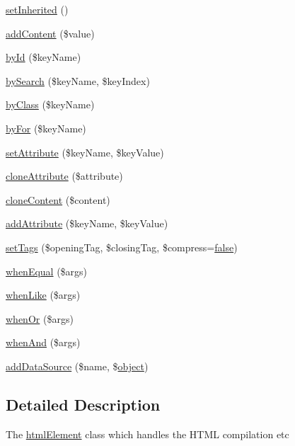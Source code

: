 \begin{DoxyCompactItemize}
\hyperlink{classhtmlElement_ade31cfc5c7d655a21183e18bd0ea492f}{set\+Inherited} ()
\item 
\hyperlink{classhtmlElement_a063bcf0695c98e25ff2b7fa9ef3c88bf}{add\+Content} (\$value)
\item 
\hyperlink{classhtmlElement_a231a77af8cc0ecb36a0714a8888c278f}{by\+Id} (\$key\+Name)
\item 
\hyperlink{classhtmlElement_a8cc57a9db714d6f615bb169424ba505c}{by\+Search} (\$key\+Name, \$key\+Index)
\item 
\hyperlink{classhtmlElement_aae8d6a0e00314fdd72301557161b4054}{by\+Class} (\$key\+Name)
\item 
\hyperlink{classhtmlElement_a329d8c6c7a261b78d39cd4b401320616}{by\+For} (\$key\+Name)
\item 
\hyperlink{classhtmlElement_ac7e4f67382cecd0b2cf4516ef38f0480}{set\+Attribute} (\$key\+Name, \$key\+Value)
\item 
\hyperlink{classhtmlElement_a5e50a939a38f541544c0166871da8853}{clone\+Attribute} (\$attribute)
\item 
\hyperlink{classhtmlElement_a505f41f80a0c7c027dcffe11ee669ff0}{clone\+Content} (\$content)
\item 
\hyperlink{classhtmlElement_a828427f0afb3dc929098581dc7df31b6}{add\+Attribute} (\$key\+Name, \$key\+Value)
\item 
\hyperlink{classhtmlElement_adb7efcd82bb90b24024930604bb9da5d}{set\+Tags} (\$opening\+Tag, \$closing\+Tag, \$compress=\hyperlink{tina4_8php_aec2deb5590a84bee262c3bea206ae88f}{false})
\item 
\hyperlink{classhtmlElement_a60b2acdcaba9e0916863769af9de9b08}{when\+Equal} (\$args)
\item 
\hyperlink{classhtmlElement_afd1361f0a10bdb099102e22f7ecf63d3}{when\+Like} (\$args)
\item 
\hyperlink{classhtmlElement_a93cf423600b179eb6f71e6bcd7a250e2}{when\+Or} (\$args)
\item 
\hyperlink{classhtmlElement_aa6e478845564e185c6f3084196b8e3b8}{when\+And} (\$args)
\item 
\hyperlink{classhtmlElement_abd1779232533ec8dcf26c5154db0c22d}{add\+Data\+Source} (\$name, \$\hyperlink{Shape_8php_a774642dc290de09e3aff55c8b594113f}{object})
\end{DoxyCompactItemize}


\subsection{Detailed Description}
The \hyperlink{classhtmlElement}{html\+Element} class which handles the H\+T\+M\+L compilation etc 

